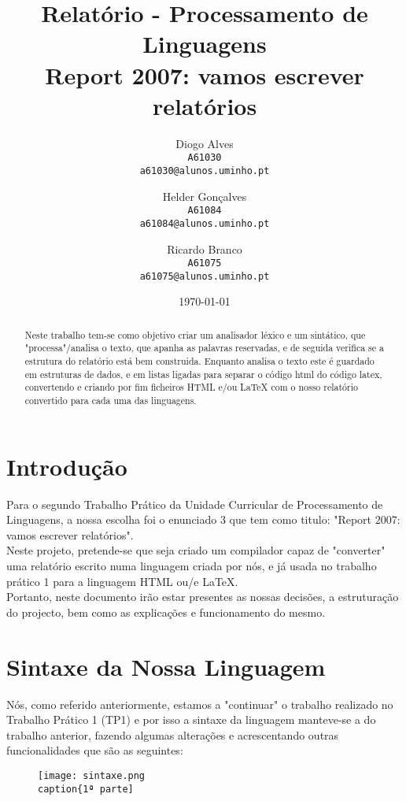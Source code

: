 \documentclass[11pt, a4paper]{report}
\title{Relatório - Processamento de Linguagens\\ 
 Report 2007: vamos escrever relatórios}
\author{
Diogo Alves
\\ \texttt{A61030}
\\ \texttt{a61030@alunos.uminho.pt}
\and 
Helder Gonçalves
\\ \texttt{A61084}
\\ \texttt{a61084@alunos.uminho.pt}
\and 
Ricardo Branco
\\ \texttt{A61075}
\\ \texttt{a61075@alunos.uminho.pt}
}
\date{\today}
\begin{document}
\maketitle
\begin{abstract}Neste trabalho tem-se como objetivo criar um analisador léxico e um sintático, que "processa"/analisa o texto, que apanha as palavras reservadas, e de seguida verifica se a estrutura do relatório está bem construida. Enquanto analisa o texto este é guardado em estruturas de dados, e em listas ligadas para separar o código html do código latex, convertendo e criando por fim ficheiros HTML e/ou LaTeX com o nosso relatório convertido para cada uma das linguagens.\\
\end{abstract}\tableofcontents
\listoffigures
\listoftables
\chapter{Introdução}
Para o segundo Trabalho Prático da Unidade Curricular de Processamento de Linguagens, a nossa escolha foi o enunciado 3 que tem como titulo: "Report 2007: vamos escrever relatórios".\\
Neste projeto, pretende-se que seja criado um compilador capaz de "converter" uma relatório escrito numa linguagem criada por nós, e já usada no trabalho prático 1 para a linguagem HTML ou/e LaTeX.\\
Portanto, neste documento irão estar presentes as nossas decisões, a estruturação do projecto, bem como as explicações e funcionamento do mesmo.\\
\chapter{Sintaxe da Nossa Linguagem}
Nós, como referido anteriormente, estamos a "continuar" o trabalho realizado no Trabalho Prático 1 (TP1) e por isso a sintaxe da linguagem manteve-se a do trabalho anterior, fazendo algumas alterações e acrescentando outras funcionalidades que são as seguintes:\\
\begin{figure}[!hbp]
\texttt{[image: sintaxe.png\\caption\{1ª parte]}
\end{figure}
\end{document}
